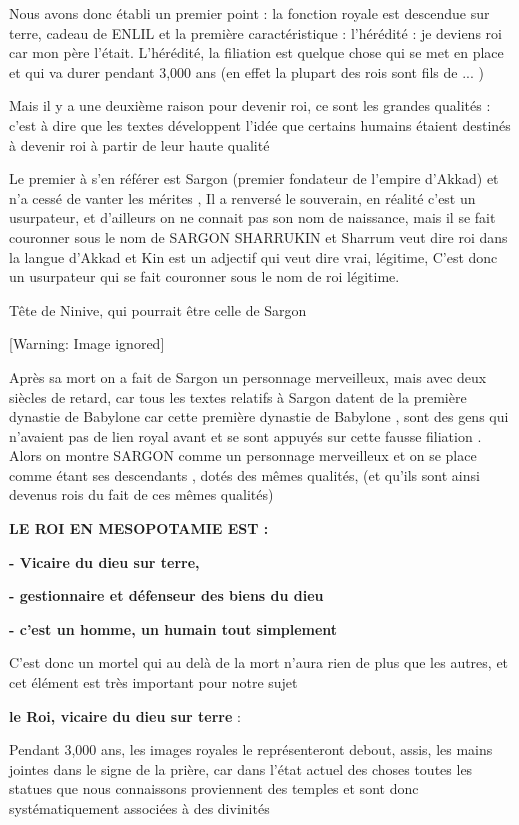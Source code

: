 \documentclass[a4paper,10pt]{article}
\begin{document}
Nous avons donc établi un premier point : la fonction royale est
descendue sur terre, cadeau de ENLIL et la première caractéristique  :
l'hérédité : je deviens roi car mon père
l'était. L'hérédité, la filiation est
quelque chose qui se met en  place et qui va durer pendant 3,000 ans
(en effet la plupart des rois sont fils de ... )

Mais il y a une deuxième raison pour devenir roi, ce sont les grandes
qualités : c'est à dire que les textes développent
l'idée que certains humains étaient destinés à devenir
roi à partir de leur haute qualité 

Le premier à s'en référer est Sargon (premier fondateur
de l'empire d'Akkad) et
n'a cessé de vanter les mérites , Il a renversé le
souverain, en réalité c'est un usurpateur, et
d'ailleurs on ne connait pas son nom de naissance,
mais il se fait couronner sous le nom de SARGON SHARRUKIN et Sharrum
veut dire roi dans la langue d'Akkad et Kin est un
adjectif qui veut dire vrai, légitime,  C'est donc un
usurpateur qui se fait couronner sous le nom de roi légitime.

Tête de Ninive, qui pourrait être celle de Sargon

  [Warning: Image ignored] %
 

Après sa mort on a fait de Sargon un personnage merveilleux, mais avec
deux siècles de retard, car tous les textes relatifs à Sargon datent de
la première dynastie de Babylone car cette première dynastie de
Babylone , sont des gens qui n'avaient pas de lien
royal avant et se sont appuyés sur cette fausse filiation . Alors on
montre SARGON comme un personnage merveilleux et on se place comme
étant ses descendants , dotés des mêmes qualités, (et
qu'ils sont ainsi devenus rois du fait de ces mêmes
qualités)

\textbf{LE ROI EN MESOPOTAMIE EST :}

\textbf{{}- Vicaire du dieu sur terre,}

\textbf{{}- gestionnaire et défenseur des biens du dieu }

\textbf{{}- c'est un homme, un humain tout simplement}

C'est donc un mortel qui au delà de la mort
n'aura rien de plus que les autres, et cet élément est
très important pour notre sujet

\textbf{le Roi, vicaire du dieu sur terre} :  

Pendant 3,000 ans, les images royales le représenteront debout, assis,
les mains jointes dans le signe de la prière, car dans
l'état actuel des choses toutes les statues que nous
connaissons proviennent des temples et sont donc systématiquement
associées à des divinités
\end{document}
